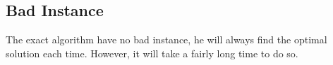 \subsection{Bad Instance}

The exact algorithm have no bad instance, he will always find the optimal solution each time. However, it will take a fairly long time to do so.